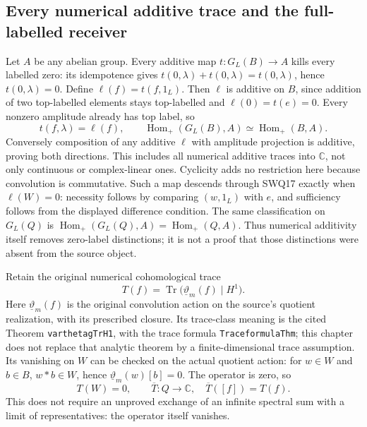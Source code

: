 \subsection{Every numerical additive trace and the full-labelled receiver}

Let $A$ be any abelian group. Every additive map
$t:G_L(B)\to A$ kills every labelled zero: its idempotence gives
$t(0,\lambda)+t(0,\lambda)=t(0,\lambda)$, hence $t(0,\lambda)=0$.
Define $\ell(f)=t(f,1_L)$. Then $\ell$ is additive on $B$, since
addition of two top-labelled elements stays top-labelled and
$\ell(0)=t(e)=0$. Every nonzero amplitude already has top label,
so
\begin{equation}\tag{SWQ20}
 t(f,\lambda)=\ell(f),\qquad
 \operatorname{Hom}_{+}(G_L(B),A)
       \simeq\operatorname{Hom}_{+}(B,A).
\end{equation}
Conversely composition of any additive $\ell$ with amplitude
projection is additive, proving both directions. This includes all
numerical additive traces into $\mathbb C$, not only continuous or
complex-linear ones. Cyclicity adds no restriction here because
convolution is commutative. Such a map descends through SWQ17
exactly when $\ell(W)=0$: necessity follows by comparing $(w,1_L)$
with $e$, and sufficiency follows from the displayed difference
condition. The same classification on $G_L(Q)$ is
$\operatorname{Hom}_{+}(G_L(Q),A)=\operatorname{Hom}_{+}(Q,A)$.
Thus numerical additivity itself removes zero-label distinctions;
it is not a proof that those distinctions were absent from the
source object.

Retain the original numerical cohomological trace
\begin{equation}\tag{SWQ21}
 T(f)=\operatorname{Tr}\bigl(\underline\vartheta_m(f)\mid H^1\bigr).
\end{equation}
Here $\underline\vartheta_m(f)$ is the original convolution action
on the source's quotient realization, with its prescribed closure.
Its trace-class meaning is the cited Theorem
\texttt{varthetagTrH1}, with the trace formula
\texttt{TraceformulaThm}; this chapter does not replace that
analytic theorem by a finite-dimensional trace assumption.
Its vanishing on $W$ can be checked on the actual quotient action:
for $w\in W$ and $b\in B$, $w*b\in W$, hence
$\underline\vartheta_m(w)[b]=0$. The operator is zero, so
\begin{equation}\tag{SWQ22}
 T(W)=0,\qquad \overline T:Q\to\mathbb C,\quad
 \overline T([f])=T(f).
\end{equation}
This does not require an unproved exchange of an infinite spectral
sum with a limit of representatives: the operator itself vanishes.


